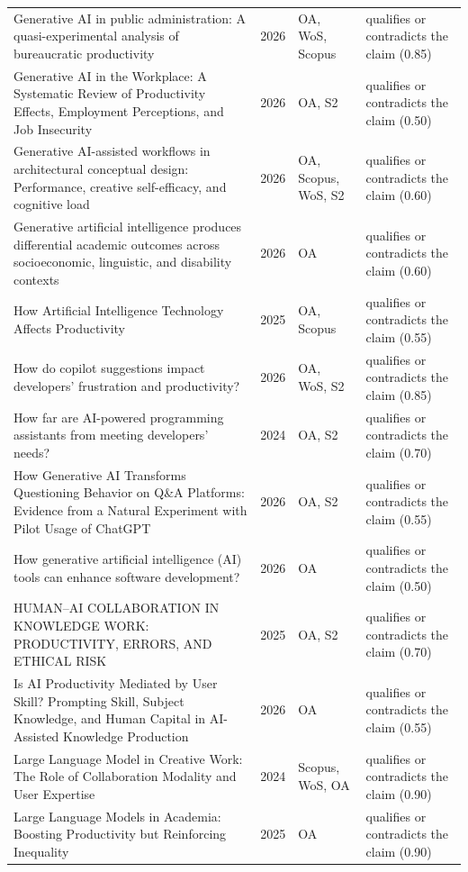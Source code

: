 \begin{longtable}{@{}%
  >{\raggedright\arraybackslash}p{}c%
  >{\raggedright\arraybackslash}p{}%
  >{\raggedright\arraybackslash}p{}@{}}
Generative AI in public administration: A quasi-experimental analysis of bureaucratic productivity & 2026 & OA, WoS, Scopus & qualifies or contradicts the claim (0.85) \\
Generative AI in the Workplace: A Systematic Review of Productivity Effects, Employment Perceptions, and Job Insecurity & 2026 & OA, S2 & qualifies or contradicts the claim (0.50) \\
Generative AI-assisted workflows in architectural conceptual design: Performance, creative self-efficacy, and cognitive load & 2026 & OA, Scopus, WoS, S2 & qualifies or contradicts the claim (0.60) \\
Generative artificial intelligence produces differential academic outcomes across socioeconomic, linguistic, and disability contexts & 2026 & OA & qualifies or contradicts the claim (0.60) \\
How Artificial Intelligence Technology Affects Productivity & 2025 & OA, Scopus & qualifies or contradicts the claim (0.55) \\
How do copilot suggestions impact developers' frustration and productivity? & 2026 & OA, WoS, S2 & qualifies or contradicts the claim (0.85) \\
How far are AI-powered programming assistants from meeting developers' needs? & 2024 & OA, S2 & qualifies or contradicts the claim (0.70) \\
How Generative AI Transforms Questioning Behavior on Q\&A Platforms: Evidence from a Natural Experiment with Pilot Usage of ChatGPT & 2026 & OA, S2 & qualifies or contradicts the claim (0.55) \\
How generative artificial intelligence (AI) tools can enhance software development? & 2026 & OA & qualifies or contradicts the claim (0.50) \\
HUMAN--AI COLLABORATION IN KNOWLEDGE WORK: PRODUCTIVITY, ERRORS, AND ETHICAL RISK & 2025 & OA, S2 & qualifies or contradicts the claim (0.70) \\
Is AI Productivity Mediated by User Skill? Prompting Skill, Subject Knowledge, and Human Capital in AI-Assisted Knowledge Production & 2026 & OA & qualifies or contradicts the claim (0.55) \\
Large Language Model in Creative Work: The Role of Collaboration Modality and User Expertise & 2024 & Scopus, WoS, OA & qualifies or contradicts the claim (0.90) \\
Large Language Models in Academia: Boosting Productivity but Reinforcing Inequality & 2025 & OA & qualifies or contradicts the claim (0.90) \\

\end{longtable}
